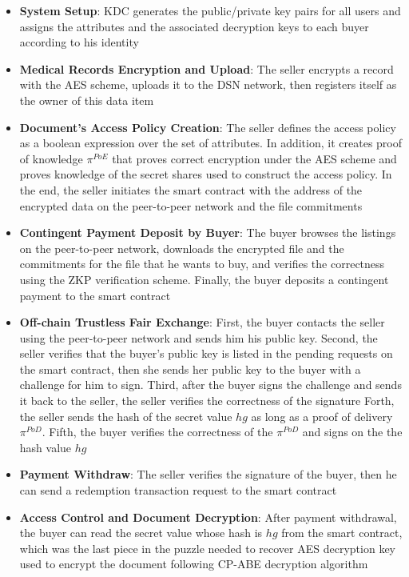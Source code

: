 \begin{itemize}
    \item \textbf{System Setup}: KDC generates the public/private key pairs for all users and assigns the attributes and the associated decryption keys to each buyer according to his identity
    \item \textbf{Medical Records Encryption and Upload}:  The seller encrypts a record with the AES scheme, uploads it to the DSN network, then registers itself as the owner of this data item
    \item \textbf{Document's Access Policy Creation}: The seller defines the access policy as a boolean expression over the set of attributes.
    In addition, it creates proof of knowledge $\pi^{PoE}$ that proves correct encryption under the AES scheme and proves knowledge of the secret shares used to construct the access policy.
    In the end, the seller initiates the smart contract with the address of the encrypted data on the peer-to-peer network and the file commitments
    \item \textbf{Contingent Payment Deposit by Buyer}: The buyer browses the listings on the peer-to-peer network, downloads the encrypted file and the commitments for the file that he wants to buy, and verifies the correctness using the ZKP verification scheme.
    Finally, the buyer deposits a contingent payment to the smart contract
    \item \textbf{Off-chain Trustless Fair Exchange}: First, the buyer contacts the seller using the peer-to-peer network and sends him his public key.
    Second, the seller verifies that the buyer's public key is listed in the pending requests on the smart contract, then she sends her public key to the buyer with a challenge for him to sign.
    Third, after the buyer signs the challenge and sends it back to the seller, the seller verifies the correctness of the signature
    Forth, the seller sends the hash of the secret value $hg$ as long as a proof of delivery $\pi^{PoD}$.
    Fifth, the buyer verifies the correctness of the $\pi^{PoD}$ and signs on the the hash value $hg$
    \item \textbf{Payment Withdraw}: The seller verifies the signature of the buyer, then he can send a redemption transaction request to the smart contract
    \item \textbf{Access Control and Document Decryption}: After payment withdrawal, the buyer can read the secret value whose hash is $hg$ from the smart contract, which was the last piece in the puzzle needed to recover AES decryption key used to encrypt the document following CP-ABE decryption algorithm
    
\end{itemize}